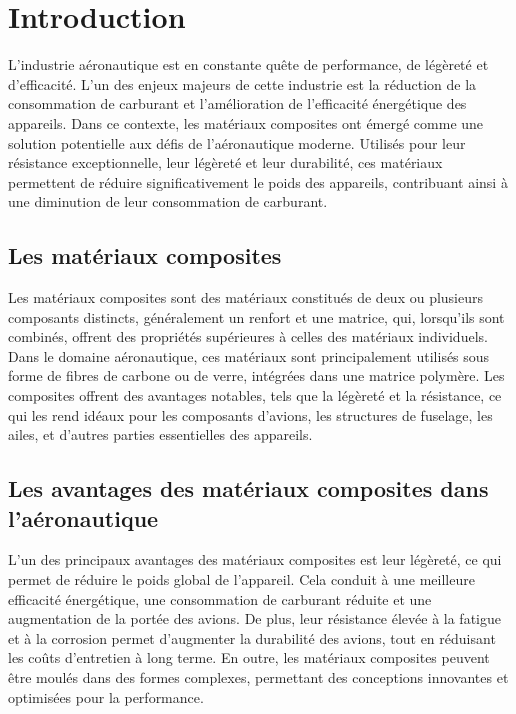 

\chapter{Introduction}

L'industrie aéronautique est en constante quête de performance, de légèreté et d'efficacité. L'un des enjeux majeurs de cette industrie est la réduction de la consommation de carburant et l'amélioration de l'efficacité énergétique des appareils. Dans ce contexte, les matériaux composites ont émergé comme une solution potentielle aux défis de l'aéronautique moderne. Utilisés pour leur résistance exceptionnelle, leur légèreté et leur durabilité, ces matériaux permettent de réduire significativement le poids des appareils, contribuant ainsi à une diminution de leur consommation de carburant.


\section{Les matériaux composites}

Les matériaux composites sont des matériaux constitués de deux ou plusieurs composants distincts, généralement un renfort et une matrice, qui, lorsqu'ils sont combinés, offrent des propriétés supérieures à celles des matériaux individuels. Dans le domaine aéronautique, ces matériaux sont principalement utilisés sous forme de fibres de carbone ou de verre, intégrées dans une matrice polymère. Les composites offrent des avantages notables, tels que la légèreté et la résistance, ce qui les rend idéaux pour les composants d'avions, les structures de fuselage, les ailes, et d'autres parties essentielles des appareils.


\section{Les avantages des matériaux composites dans l'aéronautique}

L'un des principaux avantages des matériaux composites est leur légèreté, ce qui permet de réduire le poids global de l'appareil. Cela conduit à une meilleure efficacité énergétique, une consommation de carburant réduite et une augmentation de la portée des avions. De plus, leur résistance élevée à la fatigue et à la corrosion permet d'augmenter la durabilité des avions, tout en réduisant les coûts d'entretien à long terme. En outre, les matériaux composites peuvent être moulés dans des formes complexes, permettant des conceptions innovantes et optimisées pour la performance.


